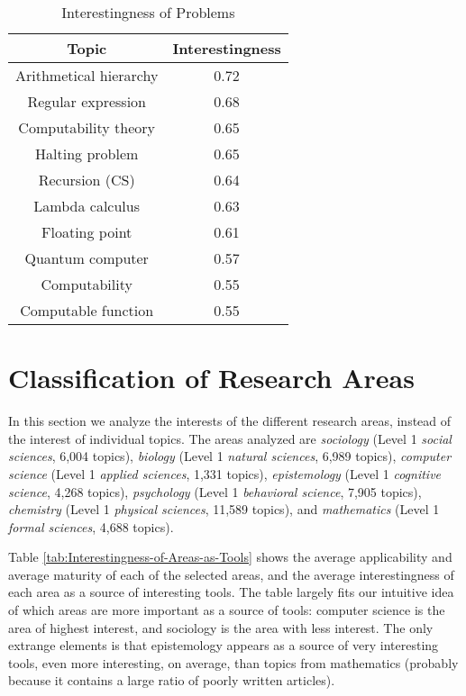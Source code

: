 \begin{table}
\begin{centering}
\begin{tabular}{|c|c|}
\hline 
Topic & Interestingness\tabularnewline
\hline 
\hline 
Arithmetical hierarchy & 0.72\tabularnewline
\hline 
Regular expression & 0.68\tabularnewline
\hline 
Computability theory & 0.65\tabularnewline
\hline 
Halting problem & 0.65\tabularnewline
\hline 
Recursion (CS) & 0.64\tabularnewline
\hline 
Lambda calculus & 0.63\tabularnewline
\hline 
Floating point & 0.61\tabularnewline
\hline 
Quantum computer & 0.57\tabularnewline
\hline 
Computability & 0.55\tabularnewline
\hline 
Computable function & 0.55\tabularnewline
\hline 
\end{tabular}
\par\end{centering}

\caption{\label{tab:Interestingness-of-Problems}Interestingness of Problems}
\end{table}

\section{Classification of Research Areas}

In this section we analyze the interests of the different research
areas, instead of the interest of individual topics. The areas analyzed
are \emph{sociology} (Level 1 \emph{social sciences}, 6,004 topics),
\emph{biology} (Level 1 \emph{natural sciences}, 6,989 topics), \emph{computer
science} (Level 1 \emph{applied sciences}, 1,331 topics), \emph{epistemology}
(Level 1 \emph{cognitive science}, 4,268 topics), \emph{psychology}
(Level 1 \emph{behavioral science}, 7,905 topics), \emph{chemistry}
(Level 1 \emph{physical sciences}, 11,589 topics), and \emph{mathematics}
(Level 1 \emph{formal sciences}, 4,688 topics).

Table \ref{tab:Interestingness-of-Areas-as-Tools} shows the average
applicability and average maturity of each of the selected areas,
and the average interestingness of each area as a source of interesting
tools. The table largely fits our intuitive idea of which areas are
more important as a source of tools: computer science is the area
of highest interest, and sociology is the area with less interest.
The only extrange elements is that epistemology appears as a source
of very interesting tools, even more interesting, on average, than
topics from mathematics (probably because it contains a large ratio
of poorly written articles).


